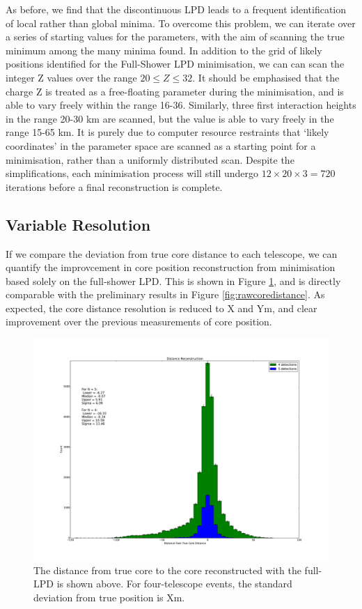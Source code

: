 \documentclass[11pt]{article}
\begin{document}
As before, we find that the discontinuous LPD leads to a frequent identification of local rather than global minima. To overcome this problem, we can iterate over a series of starting values for the parameters, with the aim of scanning the true minimum among the many minima found. In addition to the grid of likely positions identified for the Full-Shower LPD minimisation, we can can scan the integer Z values over the range $ 20 \leq Z \leq 32 $. It should be emphasised that the charge Z is treated as a free-floating parameter during the minimisation, and is able to vary freely within the range 16-36. Similarly, three first interaction heights in the range 20-30 km are scanned, but the value is able to vary freely in the range 15-65 km. It is purely due to computer resource restraints that \textquoteleft likely coordinates' in the parameter space are scanned as a starting point for a minimisation, rather than a uniformly distributed scan. Despite the simplifications, each minimisation process will still undergo $12 \times 20 \times 3 = 720$ iterations before a final reconstruction is complete. 

\subsection{Variable Resolution}
If we compare the deviation from true core distance to each telescope, we can quantify the improvcement in core position reconstruction from minimisation based solely on the full-shower LPD. This is shown in Figure \ref{fig:coredistance}, and is directly comparable with the preliminary results in Figure \ref{fig:rawcoredistance}. As expected, the core distance resolution is reduced to X and Ym, and clear improvement over the previous measurements of core position. 

\begin{figure}
\begin{center}
\includegraphics[width=\textwidth]{coredistance}
\caption{The distance from true core to the core reconstructed with the full-LPD is shown above. For four-telescope events, the standard deviation from true position is Xm. }
\label{fig:coredistance}
\end{center}
\end{figure}
\end{document}
